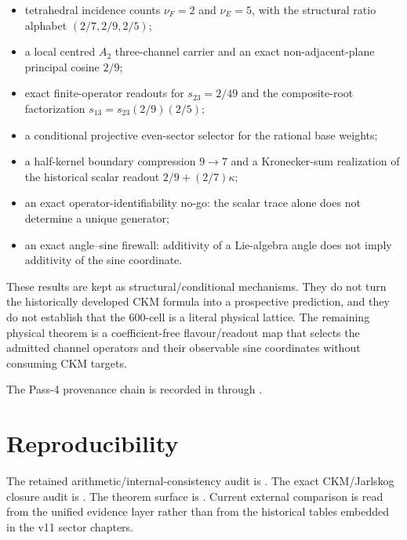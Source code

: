\begin{itemize}
\item tetrahedral incidence counts \(\nu_F=2\) and \(\nu_E=5\), with
      the structural ratio alphabet \((2/7,2/9,2/5)\);
\item a local centred \(A_2\) three-channel carrier and an exact
      non-adjacent-plane principal cosine \(2/9\);
\item exact finite-operator readouts for \(s_{23}=2/49\) and the
      composite-root factorization \(s_{13}=s_{23}(2/9)(2/5)\);
\item a conditional projective even-sector selector for the rational base
      weights;
\item a half-kernel boundary compression \(9\to7\) and a Kronecker-sum
      realization of the historical scalar readout \(2/9+(2/7)\kappa\);
\item an exact operator-identifiability no-go: the scalar trace alone does not
      determine a unique generator;
\item an exact angle--sine firewall: additivity of a Lie-algebra angle does not
      imply additivity of the sine coordinate.
\end{itemize}

These results are kept as structural/conditional mechanisms.  They do not turn
the historically developed CKM formula into a prospective prediction, and they
do not establish that the 600-cell is a literal physical lattice.  The
remaining physical theorem is a coefficient-free flavour/readout map that
selects the admitted channel operators and their observable sine coordinates
without consuming CKM targets.


The Pass-4 provenance chain is recorded in
through
.

\section{Reproducibility}
The retained arithmetic/internal-consistency audit is
.
The exact CKM/Jarlskog closure audit is
.
The theorem surface is
.
Current external comparison is read from the unified evidence layer rather than
from the historical tables embedded in the v11 sector chapters.
